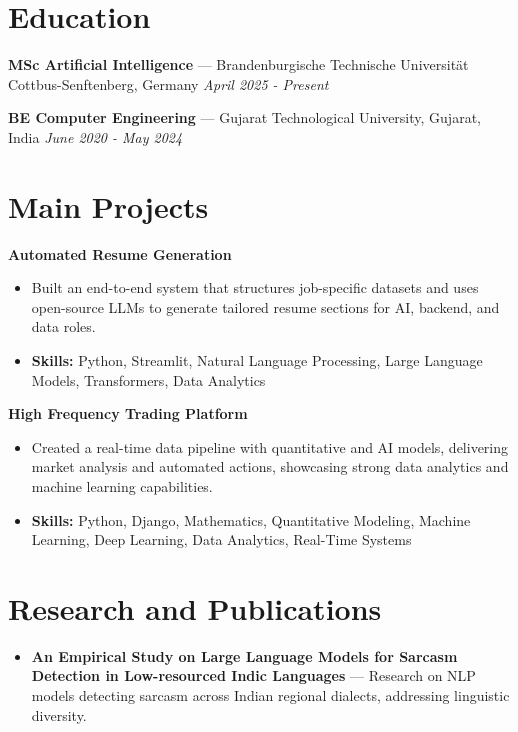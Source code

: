 \documentclass[a4paper,10pt]{article}
\begin{document}
\section*{Education}
\textbf{MSc Artificial Intelligence} — Brandenburgische Technische Universität Cottbus-Senftenberg, Germany \hfill \textit{April 2025 - Present}\par
\vspace{1.5pt}
\textbf{BE Computer Engineering} — Gujarat Technological University, Gujarat, India \hfill \textit{June 2020 - May 2024}\par

\section*{Main Projects}
\textbf{Automated Resume Generation}\par
\vspace{1pt}
\begin{itemize}
  \item Built an end-to-end system that structures job-specific datasets and uses open-source LLMs to generate tailored resume sections for AI, backend, and data roles.
  \item \textbf{Skills:} Python, Streamlit, Natural Language Processing, Large Language Models, Transformers, Data Analytics
\end{itemize}
\vspace{3pt}
\textbf{High Frequency Trading Platform}\par
\vspace{1pt}
\begin{itemize}
  \item Created a real-time data pipeline with quantitative and AI models, delivering market analysis and automated actions, showcasing strong data analytics and machine learning capabilities.
  \item \textbf{Skills:} Python, Django, Mathematics, Quantitative Modeling, Machine Learning, Deep Learning, Data Analytics, Real-Time Systems
\end{itemize}

\section*{Research and Publications}
\begin{itemize}
\item \textbf{An Empirical Study on Large Language Models for Sarcasm Detection in Low-resourced Indic Languages} — Research on NLP models detecting sarcasm across Indian regional dialects, addressing linguistic diversity.
\end{itemize}
\end{document}
